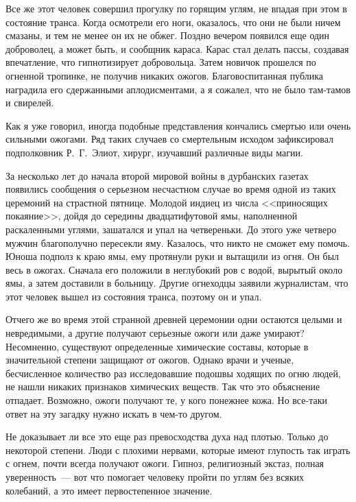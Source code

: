 \documentclass[12pt,a4paper,twoside,openany,svgnames]{memoir}
\begin{document}
Все же этот человек совершил прогулку по горящим углям, не впадая при этом в состояние транса. Когда осмотрели его ноги, оказалось, что они не были ничем смазаны, и тем не менее он их не обжег. Поздно вечером появился еще один доброволец, а может быть, и сообщник караса. Карас стал делать пассы, создавая впечатление, что гипнотизирует добровольца. Затем новичок прошелся по огненной тропинке, не получив никаких ожогов. Благовоспитанная публика наградила его сдержанными аплодисментами, а я сожалел, что не было там-тамов и свирелей.

Как я уже говорил, иногда подобные представления кончались смертью или очень сильными ожогами. Ряд таких случаев со смертельным исходом зафиксировал подполковник Р.~Г.~Элиот, хирург, изучавший различные виды магии.

За несколько лет до начала второй мировой войны в дурбанских газетах появились сообщения о серьезном несчастном случае во время одной из таких церемоний на страстной пятнице. Молодой индиец из числа <<приносящих покаяние>>, дойдя до середины двадцатифутовой ямы, наполненной раскаленными углями, зашатался и упал на четвереньки. До этого уже четверо мужчин благополучно пересекли яму. Казалось, что никто не сможет ему помочь. Юноша подполз к краю ямы, ему протянули руки и вытащили из огня. Он был весь в ожогах. Сначала его положили в неглубокий ров с водой, вырытый около ямы, а затем доставили в больницу. Другие огнеходцы заявили журналистам, что этот человек вышел из состояния транса, поэтому он и упал.

Отчего же во время этой странной древней церемонии одни остаются целыми и невредимыми, а другие получают серьезные ожоги или даже умирают? Несомненно, существуют определенные химические составы, которые в значительной степени защищают от ожогов. Однако врачи и ученые, бесчисленное количество раз исследовавшие подошвы ходящих по огню людей, не нашли никаких признаков химических веществ. Так что это объяснение отпадает. Возможно, ожоги получают те, у кого понежнее кожа. Но все-таки ответ на эту загадку нужно искать в чем-то другом.

Не доказывает ли все это еще раз превосходства духа над плотью. Только до некоторой степени. Люди с плохими нервами, которые имеют глупость так играть с огнем, почти всегда получают ожоги. Гипноз, религиозный экстаз, полная уверенность~--- вот что помогает человеку пройти по углям без всяких колебаний, а это имеет первостепенное значение.
\end{document}
